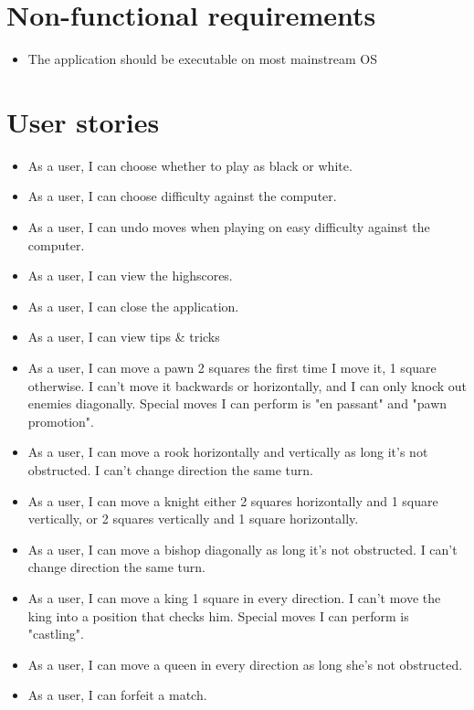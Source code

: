 \documentclass[letterpaper,11pt]{article}
\begin{document}
\section*{Non-functional requirements}
\begin{itemize}
	\item The application should be executable on most mainstream OS
\end{itemize}

\newpage
\section*{User stories}
\begin{itemize}
	\item As a user, I can choose whether to play as black or white.
	\item As a user, I can choose difficulty against the computer.
	\item As a user, I can undo moves when playing on easy difficulty against the computer.
	\item As a user, I can view the highscores.
	\item As a user, I can close the application.
	\item As a user, I can view tips \& tricks
	\item As a user, I can move a pawn 2 squares the first time I move it, 1 square otherwise. I can't move it backwards or horizontally, and I can only knock out enemies diagonally. Special moves I can perform is "en passant" and "pawn promotion".
	\item As a user, I can move a rook horizontally and vertically as long it's not obstructed. I can't change direction the same turn.
	\item As a user, I can move a knight either 2 squares horizontally and 1 square vertically, or 2 squares vertically and 1 square horizontally.
	\item As a user, I can move a bishop diagonally as long it's not obstructed. I can't change direction the same turn.
	\item As a user, I can move a king 1 square in every direction. I can't move the king into a position that checks him. Special moves I can perform is "castling".
	\item As a user, I can move a queen in every direction as long she's not obstructed.
	\item As a user, I can forfeit a match.
\end{itemize}
\end{document}

